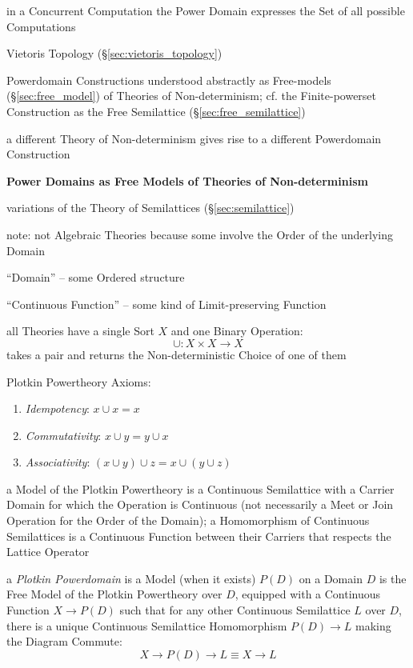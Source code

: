 in a Concurrent Computation the Power Domain expresses the Set of all
possible Computations

\fist Vietoris Topology (\S\ref{sec:vietoris_topology})

Powerdomain Constructions understood abstractly as Free-models
(\S\ref{sec:free_model}) of Theories of Non-determinism; cf. the
Finite-powerset Construction as the Free Semilattice
(\S\ref{sec:free_semilattice})

a different Theory of Non-determinism gives rise to a different
Powerdomain Construction


\textbf{Power Domains as Free Models of Theories of Non-determinism}

variations of the Theory of Semilattices (\S\ref{sec:semilattice})

\fist note: not Algebraic Theories because some involve the Order of
the underlying Domain %

``Domain'' -- some Ordered structure

``Continuous Function'' -- some kind of Limit-preserving Function

all Theories have a single Sort $X$ and one Binary Operation:
\[
  \cup : X \times X \rightarrow X
\]
takes a pair and returns the Non-deterministic Choice of one of them

Plotkin Powertheory Axioms:
\begin{enumerate}
  \item \emph{Idempotency}: $x \cup x = x$
  \item \emph{Commutativity}: $x \cup y = y \cup x$
  \item \emph{Associativity}: $(x \cup y) \cup z = x \cup (y \cup z)$
\end{enumerate}
a Model of the Plotkin Powertheory is a Continuous Semilattice with a
Carrier Domain for which the Operation is Continuous (not necessarily
a Meet or Join Operation for the Order of the Domain); a Homomorphism
of Continuous Semilattices is a Continuous Function between their
Carriers that respects the Lattice Operator

a \emph{Plotkin Powerdomain} is a Model (when it exists) $P(D)$ on a
Domain $D$ is the Free Model of the Plotkin Powertheory over $D$,
equipped with a Continuous Function $X \rightarrow P(D)$ such that for
any other Continuous Semilattice $L$ over $D$, there is a unique
Continuous Semilattice Homomorphism $P(D) \rightarrow L$ making the
Diagram Commute:
\[
  X \rightarrow P(D) \rightarrow L \equiv X \rightarrow L
\]

